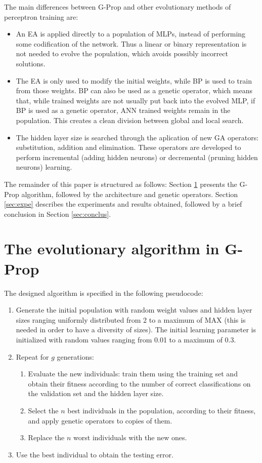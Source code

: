 \documentclass{llncs}
\begin{document}
The main differences between G-Prop and other evolutionary methods of perceptron training are:
\begin{itemize}
      \item An EA is applied directly to a population of MLPs, instead of performing some codification of the network. Thus a linear or binary representation is not needed to evolve the population, which avoids possibly incorrect solutions.
      \item The EA is only used to modify the initial weights, while BP is used to train from those weights. BP can also be used as a genetic operator, which means that, while trained weights are not usually put back into the evolved MLP, if BP is used as a genetic operator, ANN trained weights remain in the population. This creates a clean division between global and local search.
      \item The hidden layer size is searched through the aplication of new GA operators: substitution, addition and elimination. These operators are developed to perform incremental (adding hidden neurons) or decremental (pruning hidden neurons) learning.
\end{itemize}

The remainder of this paper is structured as follows: Section \ref{sec:method} presents the G-Prop algorithm, followed by the architecture and genetic operators. Section \ref{sec:expe} describes the experiments and results obtained, followed by a brief conclusion in Section \ref{sec:conclus}.
 

\section{The evolutionary algorithm in G-Prop}
\label{sec:method}

The designed algorithm is specified in the following pseudocode:

\begin{enumerate} 
	\item Generate the initial population with random weight values and hidden layer sizes ranging uniformly distributed from 2 to a maximum of MAX (this is needed in order to have a diversity of sizes). The initial learning parameter is initialized with random values ranging from 0.01 to a maximum of 0.3.
	\item Repeat for $g$ generations:
		\begin{enumerate} 
			\item Evaluate the new individuals: train them using the training set and obtain their fitness according to the number of correct classifications on the validation set and the hidden layer size.
			\item Select the $n$ best individuals in the population, according to their fitness, and apply genetic operators to copies of them.
			\item Replace the $n$ worst individuals with the new ones.
		\end{enumerate} 
	\item Use the best individual to obtain the testing error.
\end{enumerate} 
\end{document}
